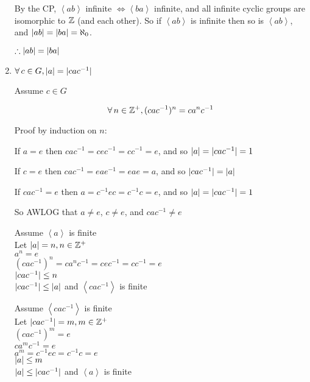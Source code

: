 \documentclass[letterpaper,12pt,fleqn]{article}
\newcommand{\cycle}[1]{\left<#1\right>}
\begin{document}
\begin{enumerate}
  By the CP, $\cycle{ab}$ infinite $\iff\cycle{ba}$ infinite, and all infinite
  cyclic groups are isomorphic to $\mathbb{Z}$ (and each other). So if $\cycle{ab}$ is
  infinite then so is $\cycle{ab}$, and $\lvert ab\rvert=\lvert ba\rvert=\aleph_0$.

  $\therefore\lvert ab\rvert=\lvert ba\rvert$

  \bigskip

\item $\forall\,c\in G,\lvert a\rvert=\lvert cac^{-1}\rvert$

  Assume $c\in G$

  \begin{lemma}
    \listbreak
    \[\forall\,n\in\mathbb{Z}^+,(cac^{-1})^n=ca^nc^{-1}\]
  \end{lemma}

  \begin{theproof}
    Proof by induction on $n$:

  \end{theproof}
  
  If $a=e$ then $cac^{-1}=cec^{-1}=cc^{-1}=e$, and so $\lvert a\rvert=\lvert cac^{-1}\rvert=1$

  If $c=e$ then $cac^{-1}=eae^{-1}=eae=a$, and so $\lvert cac^{-1}\rvert=\lvert a\rvert$

  If $cac^{-1}=e$ then $a=c^{-1}ec=c^{-1}c=e$, and so $\lvert a\rvert=\lvert cac^{-1}\rvert=1$

  So AWLOG that $a\ne e$, $c\ne e$, and $cac^{-1}\ne e$

  Assume $\cycle{a}$ is finite \\
  Let $\lvert a\rvert=n,n\in\mathbb{Z}^+$ \\
  $a^n=e$ \\
  $(cac^{-1})^n=ca^nc^{-1}=cec^{-1}=cc^{-1}=e$ \\
  $\lvert cac^{-1}\rvert\le n$ \\
  $\lvert cac^{-1}\rvert\le\lvert a\rvert$ and $\cycle{cac^{-1}}$ is finite

  Assume $\cycle{cac^{-1}}$ is finite \\
  Let $\lvert cac^{-1}\rvert=m,m\in\mathbb{Z}^+$ \\
  $(cac^{-1})^m=e$ \\
  $ca^mc^{-1}=e$ \\
  $a^m=c^{-1}ec=c^{-1}c=e$ \\
  $\lvert a\rvert\le m$ \\
  $\lvert a\rvert\le\lvert cac^{-1}\rvert$ and $\cycle{a}$ is finite


\end{enumerate}
\end{document}

